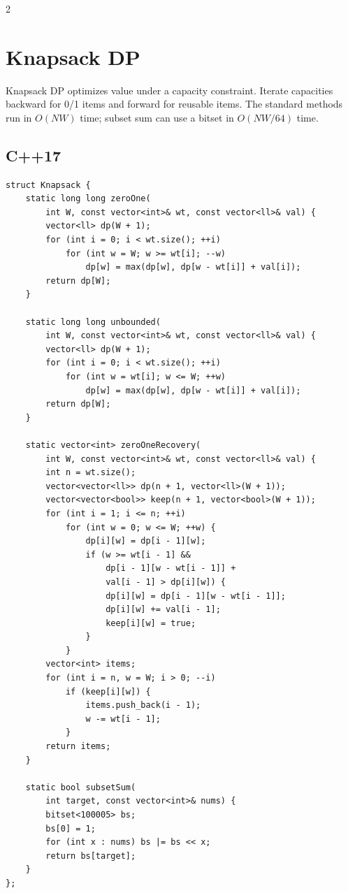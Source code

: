 \documentclass[10pt]{article}
\begin{document}
\begin{multicols}{2}

\section{Knapsack DP}
Knapsack DP optimizes value under a capacity constraint. Iterate capacities
backward for 0/1 items and forward for reusable items. The standard methods
run in $O(NW)$ time; subset sum can use a bitset in $O(NW/64)$ time.

\subsection{C++17}
\begin{framed}
\scriptsize
\begin{verbatim}
struct Knapsack {
    static long long zeroOne(
        int W, const vector<int>& wt, const vector<ll>& val) {
        vector<ll> dp(W + 1);
        for (int i = 0; i < wt.size(); ++i)
            for (int w = W; w >= wt[i]; --w)
                dp[w] = max(dp[w], dp[w - wt[i]] + val[i]);
        return dp[W];
    }

    static long long unbounded(
        int W, const vector<int>& wt, const vector<ll>& val) {
        vector<ll> dp(W + 1);
        for (int i = 0; i < wt.size(); ++i)
            for (int w = wt[i]; w <= W; ++w)
                dp[w] = max(dp[w], dp[w - wt[i]] + val[i]);
        return dp[W];
    }

    static vector<int> zeroOneRecovery(
        int W, const vector<int>& wt, const vector<ll>& val) {
        int n = wt.size();
        vector<vector<ll>> dp(n + 1, vector<ll>(W + 1));
        vector<vector<bool>> keep(n + 1, vector<bool>(W + 1));
        for (int i = 1; i <= n; ++i)
            for (int w = 0; w <= W; ++w) {
                dp[i][w] = dp[i - 1][w];
                if (w >= wt[i - 1] &&
                    dp[i - 1][w - wt[i - 1]] +
                    val[i - 1] > dp[i][w]) {
                    dp[i][w] = dp[i - 1][w - wt[i - 1]];
                    dp[i][w] += val[i - 1];
                    keep[i][w] = true;
                }
            }
        vector<int> items;
        for (int i = n, w = W; i > 0; --i)
            if (keep[i][w]) {
                items.push_back(i - 1);
                w -= wt[i - 1];
            }
        return items;
    }

    static bool subsetSum(
        int target, const vector<int>& nums) {
        bitset<100005> bs;
        bs[0] = 1;
        for (int x : nums) bs |= bs << x;
        return bs[target];
    }
};
\end{verbatim}
\end{framed}


\end{multicols}
\end{document}
